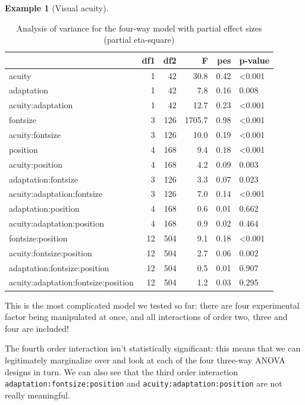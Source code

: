 \documentclass[
  11pt,
  letterpaper,
]{scrbook}
\theoremstyle{definition}
\newtheorem{example}{Example}[chapter]
\theoremstyle{definition}
\theoremstyle{remark}
\begin{document}
\begin{example}[Visual
acuity]
\begin{longtable}[t]{lrrrrl}
\caption{\label{tbl-anova-fourway}Analysis of variance for the four-way
model with partial effect sizes (partial eta-square)}

\tabularnewline

\toprule
 & df1 & df2 & F & pes & p-value\\
\midrule
acuity & 1 & 42 & 30.8 & 0.42 & <0.001\\
adaptation & 1 & 42 & 7.8 & 0.16 & 0.008\\
acuity:adaptation & 1 & 42 & 12.7 & 0.23 & <0.001\\
fontsize & 3 & 126 & 1705.7 & 0.98 & <0.001\\
acuity:fontsize & 3 & 126 & 10.0 & 0.19 & <0.001\\
\addlinespace
position & 4 & 168 & 9.4 & 0.18 & <0.001\\
acuity:position & 4 & 168 & 4.2 & 0.09 & 0.003\\
adaptation:fontsize & 3 & 126 & 3.3 & 0.07 & 0.023\\
acuity:adaptation:fontsize & 3 & 126 & 7.0 & 0.14 & <0.001\\
adaptation:position & 4 & 168 & 0.6 & 0.01 & 0.662\\
\addlinespace
acuity:adaptation:position & 4 & 168 & 0.9 & 0.02 & 0.464\\
fontsize:position & 12 & 504 & 9.1 & 0.18 & <0.001\\
acuity:fontsize:position & 12 & 504 & 2.7 & 0.06 & 0.002\\
adaptation:fontsize:position & 12 & 504 & 0.5 & 0.01 & 0.907\\
acuity:adaptation:fontsize:position & 12 & 504 & 1.2 & 0.03 & 0.295\\
\bottomrule

\end{longtable}

This is the most complicated model we tested so far: there are four
experimental factor being manipulated at once, and all interactions of
order two, three and four are included!

The fourth order interaction isn't statistically significant: this means
that we can legitimately marginalize over and look at each of the four
three-way ANOVA designs in turn. We can also see that the third order
interaction \texttt{adaptation:fontsize:position} and
\texttt{acuity:adaptation:position} are not really meaningful.


\end{example}
\end{document}

